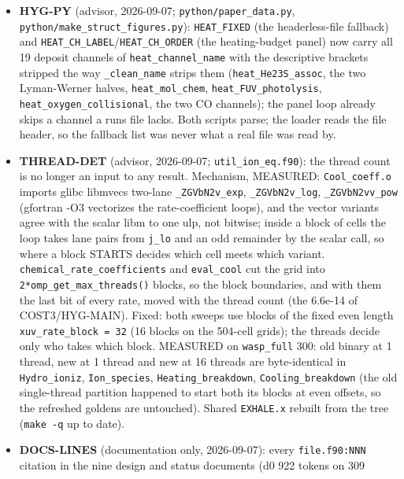 \documentclass[english,a4paper]{my_memo}
\begin{document}
\begin{itemize}
  in \texttt{docs/session\_handoff\_20260907.md}.
\item
  \textbf{HYG-PY} (advisor, 2026-09-07; \texttt{python/paper\_data.py},
  \texttt{python/make\_struct\_figures.py}): \texttt{HEAT\_FIXED} (the headerless-file
  fallback) and \texttt{HEAT\_CH\_LABEL}/\texttt{HEAT\_CH\_ORDER} (the heating-budget panel)
  now carry all 19 deposit channels of \texttt{heat\_channel\_name} with the
  descriptive brackets stripped the way \texttt{\_clean\_name} strips them
  (\texttt{heat\_He23S\_assoc}, the two Lyman-Werner halves, \texttt{heat\_mol\_chem},
  \texttt{heat\_FUV\_photolysis}, \texttt{heat\_oxygen\_collisional}, the two CO channels);
  the panel loop already skips a channel a run\textquotesingle s file lacks. Both scripts
  parse; the loader reads the file header, so the fallback list was never
  what a real file was read by.
\item
  \textbf{THREAD-DET} (advisor, 2026-09-07; \texttt{util\_ion\_eq.f90}): the thread count
  is no longer an input to any result. Mechanism, MEASURED: \texttt{Cool\_coeff.o}
  imports glibc libmvec\textquotesingle s two-lane \texttt{\_ZGVbN2v\_exp}, \texttt{\_ZGVbN2v\_log},
  \texttt{\_ZGVbN2vv\_pow} (gfortran -O3 vectorizes the rate-coefficient loops), and
  the vector variants agree with the scalar libm to one ulp, not bitwise;
  inside a block of cells the loop takes lane pairs from \texttt{j\_lo} and an odd
  remainder by the scalar call, so where a block STARTS decides which cell
  meets which variant. \texttt{chemical\_rate\_coefficients} and \texttt{eval\_cool} cut the
  grid into \texttt{2*omp\_get\_max\_threads()} blocks, so the block boundaries, and
  with them the last bit of every rate, moved with the thread count (the
  6.6e-14 of COST3/HYG-MAIN). Fixed: both sweeps use blocks of the fixed
  even length \texttt{xuv\_rate\_block\ =\ 32} (16 blocks on the 504-cell grids); the
  threads decide only who takes which block. MEASURED on \texttt{wasp\_full} 300:
  old binary at 1 thread, new at 1 thread and new at 16 threads are
  byte-identical in \texttt{Hydro\_ioniz}, \texttt{Ion\_species}, \texttt{Heating\_breakdown},
  \texttt{Cooling\_breakdown} (the old single-thread partition happened to start
  both its blocks at even offsets, so the refreshed goldens are untouched).
  Shared \texttt{EXHALE.x} rebuilt from the tree (\texttt{make\ -q} up to date).
\item
  \textbf{DOCS-LINES} (documentation only, 2026-09-07): every \texttt{file.f90:NNN}
  citation in the nine design and status documents (d0 922 tokens on 309

\end{itemize}
\end{document}
